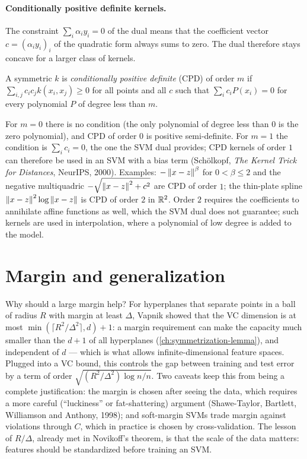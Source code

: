 \begin{notechapter}
\paragraph{Conditionally positive definite kernels.} The constraint $\sum_i\alpha_iy_i = 0$ of the
dual means that the coefficient vector $c = (\alpha_iy_i)_i$ of the quadratic form always sums to
zero. The dual therefore stays concave for a larger class of kernels.

\begin{definition}
A symmetric $k$ is \emph{conditionally positive definite} (CPD) of order $m$ if
$\sum_{i,j}c_ic_jk(x_i, x_j)\geq0$ for all points and all $c$ such that $\sum_ic_iP(x_i) = 0$ for every polynomial $P$ of
degree less than $m$.
\end{definition}

For $m = 0$ there is no condition (the only polynomial of degree less than $0$ is the zero
polynomial), and CPD of order $0$ is positive semi-definite. For $m = 1$ the condition is
$\sum_ic_i = 0$, the one the SVM dual provides; CPD kernels of order $1$ can therefore be used in an
SVM with a bias term (Schölkopf, \emph{The Kernel Trick for Distances}, NeurIPS, 2000). Examples:
$-\left\|x - z\right\|^\beta$ for $0<\beta\leq2$ and the negative multiquadric $-\sqrt{\left\|x - z\right\|^2 + c^2}$ are CPD of order $1$;
the thin-plate spline $\left\|x - z\right\|^2\log\left\|x - z\right\|$ is CPD of order $2$ in $\mathbb{R}^2$. Order $2$ requires the
coefficients to annihilate affine functions as well, which the SVM dual does not
guarantee; such kernels are used in interpolation, where a polynomial of low degree is
added to the model.

\section{Margin and generalization}\label{svm:sec:generalization}

Why should a large margin help? For hyperplanes that separate points in a ball of
radius $R$ with margin at least $\Delta$, Vapnik showed that the VC dimension is at most
$\min(\lceil R^2/\Delta^2\rceil, d) + 1$: a margin requirement can make the capacity much smaller than the
$d + 1$ of all hyperplanes (\cref{ch:symmetrization-lemma}), and independent of $d$ --- which is what allows
infinite-dimensional feature spaces. Plugged into a VC bound, this controls the gap
between training and test error by a term of order $\sqrt{(R^2/\Delta^2)\log n/n}$. Two caveats keep
this from being a complete justification: the margin is chosen after seeing the data,
which requires a more careful (``luckiness'' or fat-shattering) argument
(Shawe-Taylor, Bartlett, Williamson and Anthony, 1998); and soft-margin SVMs trade margin
against violations through $C$, which in practice is chosen by cross-validation. The
lesson of $R/\Delta$, already met in Novikoff's theorem, is that the scale of the data matters:
features should be standardized before training an SVM.


\end{notechapter}
